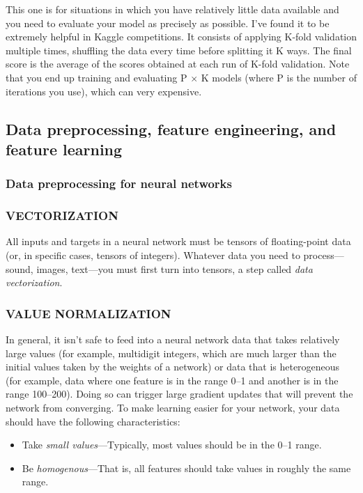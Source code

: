 \documentclass{article}
\numberwithin{equation}{section} %
\begin{document}
This one is for situations in which you have relatively little data available and you need to evaluate your model as precisely as possible. I’ve found it to be extremely helpful in Kaggle competitions. It consists of applying K-fold validation multiple times, shuffling the data every time before splitting it K ways. The final score is the average of the scores obtained at each run of K-fold validation. Note that you end up training and evaluating P $\times$ K models (where P is the number of iterations you use), which can very expensive.


\subsection{Data preprocessing, feature engineering, and feature learning}

\subsubsection{Data preprocessing for neural networks}

\subsubsection*{VECTORIZATION}

All inputs and targets in a neural network must be tensors of floating-point data (or, in specific cases, tensors of integers). Whatever data you need to process—sound, images, text—you must first turn into tensors, a step called \textit{data vectorization}.

\subsubsection*{VALUE NORMALIZATION}

In general, it isn’t safe to feed into a neural network data that takes relatively large values (for example, multidigit integers, which are much larger than the initial values taken by the weights of a network) or data that is heterogeneous (for example, data where one feature is in the range 0–1 and another is in the range 100–200). Doing so can trigger large gradient updates that will prevent the network from converging. To make learning easier for your network, your data should have the following characteristics:

\begin{itemize}
	\item Take \textit{small values}—Typically, most values should be in the 0–1 range.
	\item Be \textit{homogenous}—That is, all features should take values in roughly the same
	range.
\end{itemize}
\end{document}
